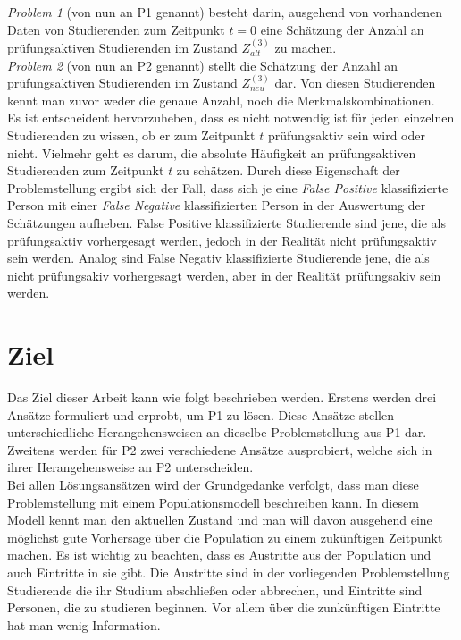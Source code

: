 \textit{Problem 1} (von nun an P1 genannt) besteht darin, ausgehend von vorhandenen Daten von Studierenden zum Zeitpunkt $t = 0$ 
eine Sch\"atzung der Anzahl an pr\"ufungsaktiven Studierenden im Zustand $Z_{alt}^{(3)}$ zu machen. \\

\textit{Problem 2} (von nun an P2 genannt) stellt die Sch\"atzung der Anzahl an pr\"ufungsaktiven Studierenden im Zustand $Z_{neu}^{(3)}$ dar. Von diesen 
Studierenden kennt man zuvor weder die genaue Anzahl, noch die Merkmalskombinationen. \\


Es ist entscheident hervorzuheben, dass es nicht notwendig ist f\"ur jeden einzelnen Studierenden zu wissen, ob er 
zum Zeitpunkt $t$  pr\"ufungsaktiv sein wird oder nicht. Vielmehr geht es darum, die absolute H\"aufigkeit an pr\"ufungsaktiven 
Studierenden zum Zeitpunkt $t$ zu sch\"atzen. Durch diese Eigenschaft der Problemstellung ergibt sich der Fall, 
dass sich je eine \textit{False Positive} klassifizierte Person mit einer 
\textit{False Negative} klassifizierten Person in der Auswertung der Sch\"atzungen aufheben. False Positive klassifizierte Studierende sind jene, die 
als pr\"ufungsaktiv vorhergesagt werden, jedoch in der Realit\"at nicht pr\"ufungsaktiv sein werden. Analog sind False Negativ klassifizierte Studierende jene, die 
als nicht pr\"ufungsakiv  vorhergesagt werden, aber in der Realit\"at pr\"ufungsakiv sein werden.  \\









\section{Ziel}
Das Ziel dieser Arbeit kann wie folgt beschrieben werden. Erstens werden drei Ans\"atze formuliert und erprobt,
um P1 zu l\"osen. Diese Ans\"atze stellen unterschiedliche Herangehensweisen an dieselbe Problemstellung aus P1 dar.
Zweitens werden f\"ur P2 zwei verschiedene Ans\"atze ausprobiert, welche sich in ihrer Herangehensweise an P2 unterscheiden. \\


Bei allen L\"osungsans\"atzen wird der Grundgedanke verfolgt, dass man diese Problemstellung mit einem Populationsmodell beschreiben kann.
In diesem Modell kennt man den aktuellen Zustand und man will davon ausgehend eine m\"oglichst gute Vorhersage \"uber die Population zu einem zuk\"unftigen 
Zeitpunkt machen. Es ist wichtig zu beachten, dass es Austritte aus der Population und auch Eintritte in sie gibt. Die Austritte sind in der vorliegenden Problemstellung 
Studierende die ihr Studium abschlie{\ss}en oder abbrechen, und Eintritte sind Personen, die zu studieren beginnen. Vor allem \"uber die zunk\"unftigen Eintritte 
hat man wenig Information. \\

